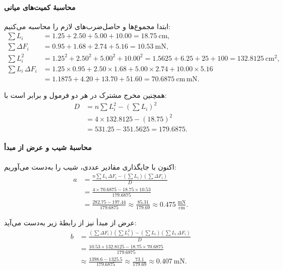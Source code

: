 \documentclass[a4paper, 11pt]{article}
\begin{document}
\paragraph{محاسبهٔ کمیت‌های میانی}
ابتدا مجموع‌ها و حاصل‌ضرب‌های لازم را محاسبه می‌کنیم:
\begin{align}
\sum L_i &= 1.25 + 2.50 + 5.00 + 10.00 = 18.75~\mathrm{cm}, \\
\sum \Delta F_i &= 0.95 + 1.68 + 2.74 + 5.16 = 10.53~\mathrm{mN}, \\
\sum L_i^2 &= 1.25^2 + 2.50^2 + 5.00^2 + 10.00^2 
           = 1.5625 + 6.25 + 25 + 100 
           = 132.8125~\mathrm{cm}^2, \\
\sum L_i\,\Delta F_i &= 1.25\times 0.95 + 2.50\times 1.68 + 5.00\times 2.74 + 10.00\times 5.16 \nonumber\\
&= 1.1875 + 4.20 + 13.70 + 51.60 
= 70.6875~\mathrm{cm\,mN}.
\end{align}

همچنین مخرج مشترک در هر دو فرمول  و  برابر است با:
\begin{align}
D &= n\sum L_i^2 - \left(\sum L_i\right)^2 \nonumber\\
  &= 4\times 132.8125 - (18.75)^2 \nonumber\\
  &= 531.25 - 351.5625 = 179.6875.
\end{align}

\paragraph{محاسبهٔ شیب و عرض از مبدأ}
اکنون با جایگذاری مقادیر عددی، شیب  را به‌دست می‌آوریم:
\begin{align}
a &= \frac{n\sum L_i\,\Delta F_i - \left(\sum L_i\right)\left(\sum \Delta F_i\right)}
         {D} \nonumber\\
  &= \frac{4\times 70.6875 - 18.75\times 10.53}{179.6875} \nonumber\\
  &= \frac{282.75 - 197.44}{179.6875} \approx \frac{85.31}{179.69} \approx 0.475~\frac{\mathrm{mN}}{\mathrm{cm}}.
\end{align}

عرض از مبدأ  نیز از رابطهٔ زیر به‌دست می‌آید:
\begin{align}
b &= \frac{\left(\sum \Delta F_i\right)\left(\sum L_i^2\right) - \left(\sum L_i\right)\left(\sum L_i\,\Delta F_i\right)}
         {D} \nonumber\\
  &= \frac{10.53\times 132.8125 - 18.75\times 70.6875}{179.6875} \nonumber\\
  &\approx \frac{1398.6 - 1325.5}{179.6875} \approx \frac{73.1}{179.69} \approx 0.407~\mathrm{mN}.
\end{align}
\end{document}
